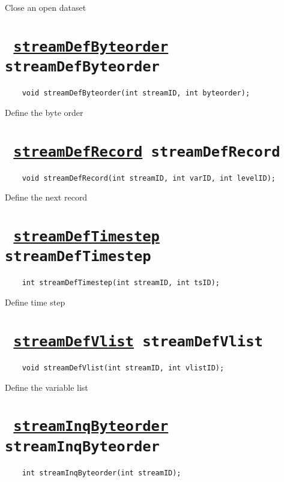 Close an open dataset
\ifpdfoutput{}{(\ref{streamClose})}


\section*{\tt 
\ifpdf
\hyperref[streamDefByteorder]{streamDefByteorder}
\else
streamDefByteorder
\fi
}
\begin{verbatim}
    void streamDefByteorder(int streamID, int byteorder);
\end{verbatim}

Define the byte order
\ifpdfoutput{}{(\ref{streamDefByteorder})}


\section*{\tt 
\ifpdf
\hyperref[streamDefRecord]{streamDefRecord}
\else
streamDefRecord
\fi
}
\begin{verbatim}
    void streamDefRecord(int streamID, int varID, int levelID);
\end{verbatim}

Define the next record
\ifpdfoutput{}{(\ref{streamDefRecord})}


\section*{\tt 
\ifpdf
\hyperref[streamDefTimestep]{streamDefTimestep}
\else
streamDefTimestep
\fi
}
\begin{verbatim}
    int streamDefTimestep(int streamID, int tsID);
\end{verbatim}

Define time step
\ifpdfoutput{}{(\ref{streamDefTimestep})}


\section*{\tt 
\ifpdf
\hyperref[streamDefVlist]{streamDefVlist}
\else
streamDefVlist
\fi
}
\begin{verbatim}
    void streamDefVlist(int streamID, int vlistID);
\end{verbatim}

Define the variable list
\ifpdfoutput{}{(\ref{streamDefVlist})}


\section*{\tt 
\ifpdf
\hyperref[streamInqByteorder]{streamInqByteorder}
\else
streamInqByteorder
\fi
}
\begin{verbatim}
    int streamInqByteorder(int streamID);
\end{verbatim}

